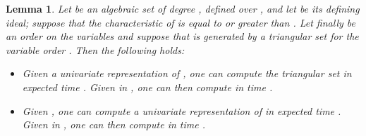 \documentclass[12pt]{article}
\newtheorem{Lemma}{Lemma}
\begin{document}
\begin{Lemma}\label{lemma:conv}
  Let  be an algebraic set of degree ,
  defined over , and let  be its
  defining ideal; suppose that the characteristic of  is equal to
   or greater than . Let finally  be an order on the
  variables  and suppose that  is generated by a
  triangular set  for the variable order . Then the following
  holds:
  \begin{itemize}
  \item Given a univariate representation  of ,
    one can compute the triangular set  in expected time
    . Given  in , one
    can then compute  in time
    .

  \item Given , one can compute a univariate representation
     of  in expected time .
    Given  in , one can then compute  in time .
  \end{itemize}
\end{Lemma}
\end{document}
